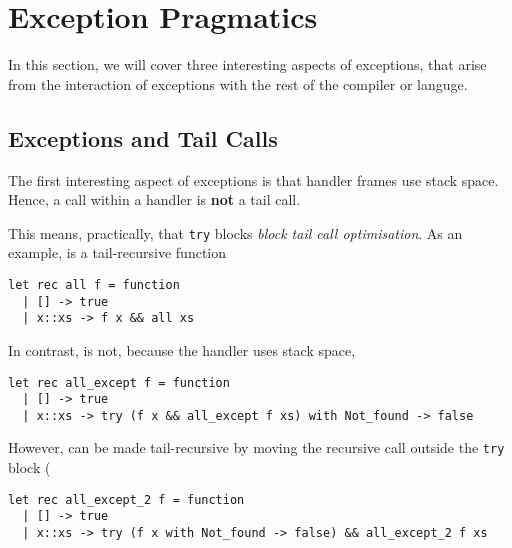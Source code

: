 \section{Exception Pragmatics}
In this section, we will cover three interesting aspects of exceptions, that arise from the interaction of exceptions with the rest of the compiler or languge. 

\subsection{Exceptions and Tail Calls}
The first interesting aspect of exceptions is that handler frames use stack space. Hence, a call within a handler is \textbf{not} a tail call. 

This means, practically, that \texttt{try} blocks \textit{block tail call optimisation}. As an example,  is a tail-recursive function

\begin{code}
    \label{code:all-ocaml}
\begin{verbatim}
let rec all f = function 
  | [] -> true
  | x::xs -> f x && all xs
\end{verbatim}
\end{code}

In contrast,  is not, because the handler uses stack space,

\begin{code}
    \label{code:all-except-ocaml}
\begin{verbatim}
let rec all_except f = function 
  | [] -> true
  | x::xs -> try (f x && all_except f xs) with Not_found -> false
\end{verbatim}
\end{code}

However,  can be made tail-recursive by moving the recursive call outside the \texttt{try} block (

\begin{code}
    \label{code:all-except-2-ocaml}
\begin{verbatim}
let rec all_except_2 f = function 
  | [] -> true
  | x::xs -> try (f x with Not_found -> false) && all_except_2 f xs
\end{verbatim}
\end{code}


